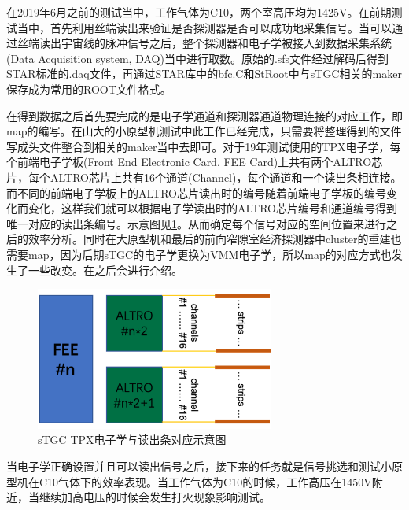 在2019年6月之前的测试当中，工作气体为C10，两个室高压均为1425V。在前期测试当中，首先利用丝端读出来验证是否探测器是否可以成功地采集信号。当可以通过丝端读出宇宙线的脉冲信号之后，整个探测器和电子学被接入到数据采集系统(Data Acquisition system, DAQ)当中进行取数。原始的.sfs文件经过解码后得到STAR标准的.daq文件，再通过STAR库中的bfc.C和StRoot中与sTGC相关的maker保存成为常用的ROOT文件格式。

在得到数据之后首先要完成的是电子学通道和探测器通道物理连接的对应工作，即map的编写。在山大的小原型机测试中此工作已经完成，只需要将整理得到的文件写成头文件整合到相关的maker当中去即可。对于19年测试使用的TPX电子学，每个前端电子学板(Front End Electronic Card, FEE Card)上共有两个ALTRO芯片，每个ALTRO芯片上共有16个通道(Channel)，每个通道和一个读出条相连接。而不同的前端电子学板上的ALTRO芯片读出时的编号随着前端电子学板的编号变化而变化，这样我们就可以根据电子学读出时的ALTRO芯片编号和通道编号得到唯一对应的读出条编号。示意图见\ref{fig:TPX_map}。从而确定每个信号对应的空间位置来进行之后的效率分析。同时在大原型机和最后的前向窄隙室经济探测器中cluster的重建也需要map，因为后期sTGC的电子学更换为VMM电子学，所以map的对应方式也发生了一些改变。在之后会进行介绍。
\begin{figure}[htb]
    \begin{center}
    \includegraphics[width=0.7\textwidth,clip]{figures/Chapter3/TPX_map.png}
    \end{center}
    \caption[sTGC TPX电子学与读出条对应示意图]{sTGC TPX电子学与读出条对应示意图}
    \label{fig:TPX_map}
\end{figure}

当电子学正确设置并且可以读出信号之后，接下来的任务就是信号挑选和测试小原型机在C10气体下的效率表现。当工作气体为C10的时候，工作高压在1450V附近，当继续加高电压的时候会发生打火现象影响测试。

